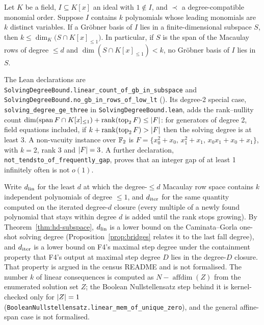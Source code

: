 \begin{theorem}\label{thm:hd-subspace}
Let $K$ be a field, $I\subseteq K[x]$ an ideal with $1\notin I$, and $\prec$
a degree-compatible monomial order. Suppose $I$ contains $k$ polynomials
whose leading monomials are $k$ distinct variables. If a Gröbner basis of
$I$ lies in a finite-dimensional subspace $S$, then
$k\le\dim_K\bigl(S\cap K[x]_{\le1}\bigr)$. In particular, if $S$ is the span
of the Macaulay rows of degree $\le d$ and $\dim(S\cap K[x]_{\le1})<k$, no
Gröbner basis of $I$ lies in $S$.
\end{theorem}

The Lean declarations are
\texttt{SolvingDegreeBound.linear\_count\_of\_gb\_in\_subspace} and
\texttt{SolvingDegreeBound.no\_gb\_in\_rows\_of\_low\_lt}
().
Its degree-2 special case, \texttt{solving\_degree\_ge\_three} in
\texttt{SolvingDegreeBound.lean}, adds the rank--nullity count
$\dim(\operatorname{span}F\cap K[x]_{\le1})+\operatorname{rank}(\operatorname{top}_2F)\le\lvert F \rvert$:
for generators of degree 2, field equations included, if
$k+\operatorname{rank}(\operatorname{top}_2F)>\lvert F \rvert$ then the solving degree
is at least 3. A non-vacuity instance over $\mathbb{F}_2$ is
$F=\{x_0^2+x_0,\,x_1^2+x_1,\,x_0x_1+x_0+x_1\}$, with $k=2$, rank 3 and
$\lvert F \rvert=3$. A further declaration, \texttt{not\_tendsto\_of\_frequently\_gap},
proves that an integer gap of at least 1 infinitely often is not $o(1)$.

Write $d_{\rm lin}$ for the least $d$ at which the degree-$\le d$ Macaulay
row space contains $k$ independent polynomials of degree $\le1$, and
$d_{\rm iter}$ for the same quantity computed on the iterated degree-$d$
closure (every multiple of a newly found polynomial that stays within degree
$d$ is added until the rank stops growing). By Theorem~\ref{thm:hd-subspace},
$d_{\rm lin}$ is a lower bound on the Caminata--Gorla one-shot solving degree
(Proposition~\ref{prop:bridges} relates it to the last fall degree), and
$d_{\rm iter}$ is a lower bound on F4's maximal step degree under the
containment property that F4's output at maximal step degree $D$ lies in the
degree-$D$ closure. That property is argued in the census README and is not
formalised. The number $k$ of linear consequences is computed as
$N-\operatorname{affdim}(Z)$ from the enumerated solution set $Z$; the
Boolean Nullstellensatz step behind it is kernel-checked only for $\lvert Z \rvert=1$
(\texttt{BooleanNullstellensatz.linear\_mem\_of\_unique\_zero}), and the
general affine-span case is not formalised.

